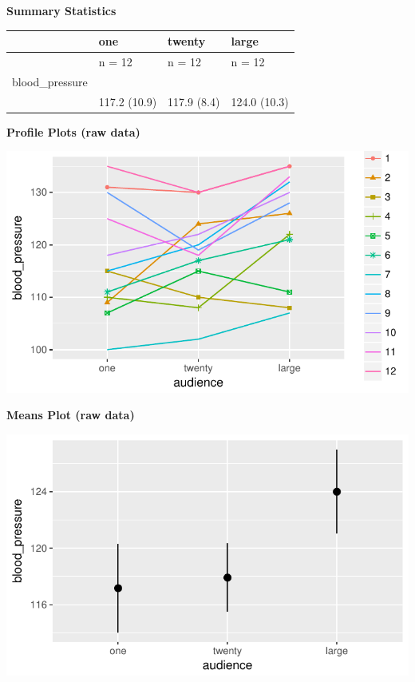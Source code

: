 \documentclass[]{article}
\begin{document}
\clearpage

\textbf{Summary Statistics}

\begin{longtable}[]{@{}llll@{}}
\toprule
& one & twenty & large\tabularnewline
\midrule
\endhead
& n = 12 & n = 12 & n = 12\tabularnewline
blood\_pressure & & &\tabularnewline
& 117.2 (10.9) & 117.9 (8.4) & 124.0 (10.3)\tabularnewline
\bottomrule
\end{longtable}

\textbf{Profile Plots (raw data)}

\begin{center}\includegraphics{Unit_5_assignment_KEY_R__spr18__files/figure-latex/unnamed-chunk-4-1} \end{center}

\textbf{Means Plot (raw data)}

\begin{center}\includegraphics{Unit_5_assignment_KEY_R__spr18__files/figure-latex/unnamed-chunk-5-1} \end{center}
\end{document}
